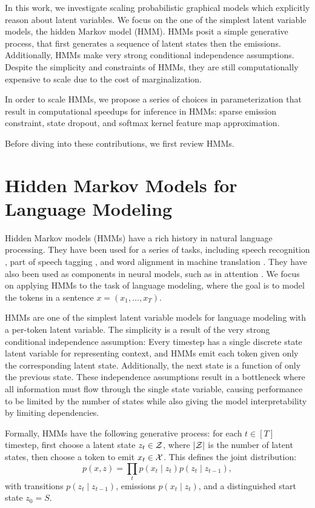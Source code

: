 \documentclass{article}
\begin{document}
In this work, we investigate scaling probabilistic graphical models
which explicitly reason about latent variables.
We focus on the one of the simplest latent variable models,
the hidden Markov model (HMM).
HMMs posit a simple generative process, that first generates a sequence of
latent states then the emissions.
Additionally, HMMs make very strong conditional independence assumptions.
Despite the simplicity and constraints of HMMs,
they are still computationally expensive to scale
due to the cost of marginalization.

In order to scale HMMs, we propose a series of choices in parameterization
that result in computational speedups for inference in HMMs:
sparse emission constraint, state dropout, and softmax kernel feature map approximation.

Before diving into these contributions, we first review HMMs.

\section{Hidden Markov Models for Language Modeling}
Hidden Markov models (HMMs) have a rich history in natural language processing.
They have been used for a series of tasks, including
speech recognition \citep{rabiner1990tut},
part of speech tagging \citep{merialdo1994tagging}, 
and word alignment in machine translation \citep{vogel1996hmm}.
They have also been used as components in neural models,
such as in attention \citep{shankar2018posterior}.
We focus on applying HMMs to the task of language modeling,
where the goal is to model the tokens in a sentence $x = (x_1,\ldots,x_T)$.

HMMs are one of the simplest latent variable models for language modeling
with a per-token latent variable.
The simplicity is a result of the very strong conditional independence assumption:
Every timestep has a single discrete state latent variable for representing context,
and HMMs emit each token given only the corresponding latent state.
Additionally, the next state is a function of only the previous state.
These independence assumptions result in a bottleneck where all information
must flow through the single state variable,
causing performance to be limited by the number of states
while also giving the model interpretability by limiting dependencies.

Formally, HMMs have the following generative process:
for each $t \in [T]$ timestep, first choose a latent state $z_t \in \mathcal{Z}$,
where $|\mathcal{Z}|$ is the number of latent states,
then choose a token to emit $x_t \in \mathcal{X}$.
This defines the joint distribution:
\begin{equation}
p(x,z) = \prod_t p(x_t\mid z_t) p(z_t \mid z_{t-1}),
\end{equation}
with transitions $p(z_t \mid z_{t-1})$, emissions $p(x_t \mid z_t)$,
and a distinguished start state $z_0 = S$.
\end{document}
